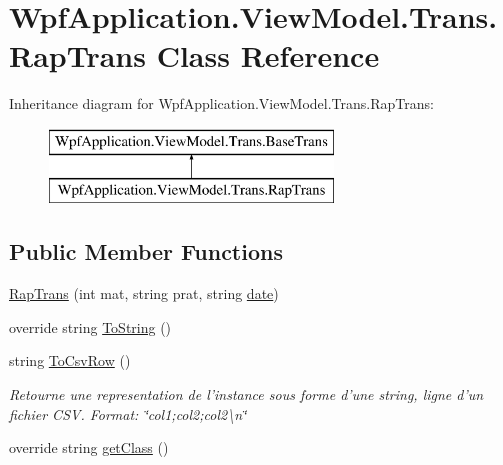 \hypertarget{class_wpf_application_1_1_view_model_1_1_trans_1_1_rap_trans}{\section{Wpf\-Application.\-View\-Model.\-Trans.\-Rap\-Trans Class Reference}
\label{class_wpf_application_1_1_view_model_1_1_trans_1_1_rap_trans}
}
Inheritance diagram for Wpf\-Application.\-View\-Model.\-Trans.\-Rap\-Trans\-:\begin{figure}[H]
\begin{center}
\leavevmode
\includegraphics[height=2.000000cm]{class_wpf_application_1_1_view_model_1_1_trans_1_1_rap_trans}
\end{center}
\end{figure}
\subsection*{Public Member Functions}
\begin{DoxyCompactItemize}
\item 
\hyperlink{class_wpf_application_1_1_view_model_1_1_trans_1_1_rap_trans_aba3e175b49d344cb2f9a640dca1aceba}{Rap\-Trans} (int mat, string prat, string \hyperlink{class_wpf_application_1_1_view_model_1_1_trans_1_1_rap_trans_ad562e5cf54632e117c242e7a1904c842}{date})
\item 
override string \hyperlink{class_wpf_application_1_1_view_model_1_1_trans_1_1_rap_trans_a1b602f2f0fe337f5c8c4e2b02a952e2c}{To\-String} ()
\item 
string \hyperlink{class_wpf_application_1_1_view_model_1_1_trans_1_1_rap_trans_a1e91573fc69c94a7817d46d7808ab22b}{To\-Csv\-Row} ()
\begin{DoxyCompactList}\small\item\em Retourne une representation de l'instance sous forme d'une string, ligne d'un fichier C\-S\-V. Format\-: \char`\"{}col1;col2;col2\textbackslash{}n\char`\"{} \end{DoxyCompactList}\item 
override string \hyperlink{class_wpf_application_1_1_view_model_1_1_trans_1_1_rap_trans_acbc5326d57143463f3d26fe66dab7a14}{get\-Class} ()
\end{DoxyCompactItemize}
